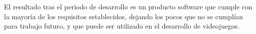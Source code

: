 El resultado tras el periodo de desarrollo es un producto software que cumple con la mayoría de los requisitos establecidos, dejando los pocos que no se cumplían para trabajo futuro, y que puede ser utilizado en el desarrollo de videojuegos.